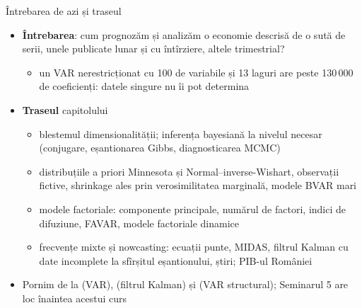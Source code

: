 \begin{frame}{Întrebarea de azi și traseul}
\itemsize{\small}
\begin{itemize}
    \item \textbf{Întrebarea}: cum prognozăm și analizăm o economie descrisă de o sută de serii, unele publicate lunar și cu întîrziere, altele trimestrial?
    \begin{itemize}
        \item un VAR nerestricționat cu 100 de variabile și 13 laguri are peste 130\,000 de coeficienți: datele singure nu îi pot determina
    \end{itemize}
    \item \textbf{Traseul} capitolului
    \begin{itemize}
        \item blestemul dimensionalității; inferența bayesiană la nivelul necesar (conjugare, eșantionarea Gibbs, diagnosticarea MCMC)
        \item distribuțiile a priori Minnesota și Normal--inverse-Wishart, observații fictive, shrinkage ales prin verosimilitatea marginală, modele BVAR mari
        \item modele factoriale: componente principale, numărul de factori, indici de difuziune, FAVAR, modele factoriale dinamice
        \item frecvențe mixte și nowcasting: ecuații punte, MIDAS, filtrul Kalman cu date incomplete la sfîrșitul eșantionului, știri; PIB-ul României
    \end{itemize}
    \item Pornim de la  (VAR),  (filtrul Kalman) și  (VAR structural); Seminarul 5 are loc înaintea acestui curs
\end{itemize}
\end{frame}

